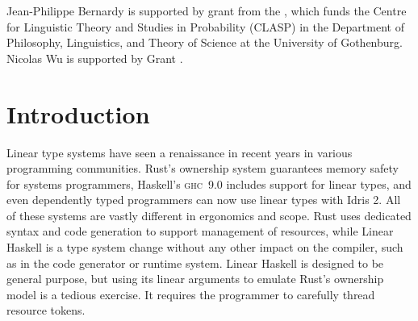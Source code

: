 \documentclass[acmsmall,usenames,dvipsnames,natbib=false,acmthm=false,screen]{acmart}
\theoremstyle{acmplain}
\theoremstyle{acmdefinition}
\begin{document}
\begin{abstract}
  A linear parameter must be consumed exactly once in the body of its
  function. When declaring resources such as file handles and manually
  managed memory as linear arguments, a linear type system can verify
  that these resources are used safely.
  However, writing code with explicit linear arguments requires bureaucracy.
  This paper presents \emph{linear constraints}, a front-end feature for
  linear typing that
  decreases the bureaucracy of working with linear types.
  Linear constraints are implicit linear arguments that are
  filled in automatically by the compiler.
  We present linear constraints as a qualified type system,
  together with an inference algorithm which extends
  \textsc{ghc}'s existing constraint solver algorithm. Soundness of
  linear constraints is ensured by the fact that they desugar into
  Linear Haskell.
\end{abstract}

\maketitle

\newcommand{\maybesmall}{\small}

\begin{acks}
  Jean-Philippe Bernardy is supported by grant
   from the , which funds the Centre for
  Linguistic Theory and Studies in Probability (CLASP) in the
  Department of Philosophy, Linguistics, and Theory of Science at the
  University of Gothenburg.
%
  Nicolas Wu is supported by
  Grant .


\end{acks}

\section{Introduction}
\label{sec:introduction}

Linear type systems have seen a renaissance in recent years in
various programming communities. Rust's ownership system guarantees
memory safety for systems programmers, Haskell's \textsc{ghc}~9.0 includes
support for linear types, and even
dependently typed programmers can now use linear types with Idris 2.
All of these systems are vastly different in ergonomics and
scope. Rust uses dedicated syntax and code generation
to support management of resources, while Linear Haskell is a
type system change without any other impact on the compiler, such as in the
code generator or runtime system. Linear Haskell
is designed to be general purpose, but
using its linear arguments to emulate Rust's ownership model is a tedious exercise. It
requires
the programmer to carefully thread resource tokens.
\end{document}
